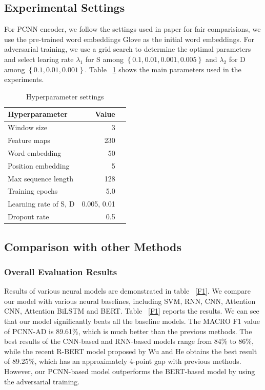 \documentclass[conference]{IEEEtran}
\begin{document}
\subsection{Experimental Settings}
\label{subsect:hyper}
For PCNN encoder, we follow the settings used in paper\cite{zeng2015distant} for fair comparisions,
we use the pre-trained word embeddings Glove \cite{pennington2014glove} as the initial word embeddings.
For adversarial training, we use a grid search to determine the optimal parameters and select learing rate $\lambda_{1}$ for S among $\left \{0.1, 0.01, 0.001, 0.005  \right \}$ and $\lambda_{2}$ for D among $\left \{0.1, 0.01, 0.001 \right \}$.  
Table ~\ref{parameters} shows the main parameters used in the experiments.
\begin{table}
\caption{\label{parameters} Hyperparameter settings}
  \centering
  \begin{tabular}{lrl}
  \hline \textbf{Hyperparameter} & \textbf{Value}\\ \hline
  Window size & 3\\
  Feature maps & 230\\
  Word embedding & 50\\
  Position embedding & 5\\
  Max sequence length & 128\\
  Training epochs & 5.0\\
  Learning rate of S, D & 0.005, 0.01\\
  Dropout rate & 0.5\\
  \hline
  \end{tabular}
  
  \end{table}

\subsection{Comparison with other Methods}
\subsubsection*{Overall Evaluation Results}
Results of various neural models are demonstrated in table ~\ref{F1}.
We compare our model with various neural baselines, including SVM, RNN, CNN, Attention CNN, Attention BiLSTM and BERT.
Table ~\ref{F1} reports the results.
We can see that our model significantly beats all the baseline models.
The MACRO F1 value of PCNN-AD is 89.61\%, which is much better than the previous methods.
The best results of the CNN-based and RNN-based models range from 84\% to 86\%, while the recent R-BERT model proposed by Wu and He \cite{DBLP:journals/corr/abs-1905-08284} obtains the best result of 89.25\%, which has an approximately 4-point gap with
previous methods. However, our PCNN-based model outperforms the BERT-based model by using the adversarial training.
\end{document}
